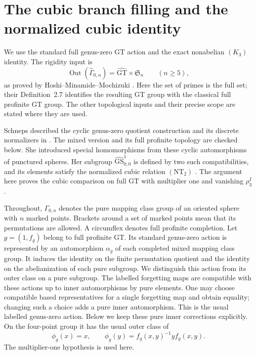 \section{The cubic branch filling and the normalized cubic identity}
\label{sec:normalized-cubic-identity}

We use the standard full genus-zero GT action and the exact
nonabelian $(K_3)$ identity. The rigidity input is
\begin{equation}\label{eq:cubic-normalizer-1}
\operatorname{Out}(\widehat\Gamma_{0,n})
 =\widehat{\mathrm{GT}}\times\mathfrak S_n\qquad(n\ge5),
\end{equation}
as proved by Hoshi--Minamide--Mochizuki
\cite[Definition~2.7 and Corollary~2.8(i), author pp.~31--32]{CubicHMM}.
Here the set of primes is the full set; their Definition~2.7
identifies the resulting GT group with the classical full
profinite GT group. The other topological inputs and their
precise scope are stated where they are used.

Schneps described the cyclic genus-zero quotient construction and its
discrete normalizers in \cite[Section~4.3,
Theorems~4.3.1--4.3.2, author pp.~54--58]{SchnepsSpecialLoci}.
The mixed version and its full profinite topology are checked below.
She introduced special homomorphisms from these cyclic automorphisms
of punctured spheres. Her subgroup $\widehat{\mathrm{GS}}^1_{0,0}$
is defined by two such compatibilities, and its elements satisfy
the normalized cubic relation $(\mathrm{NT}_2)$
\cite[Definition~1.2, p.~658; Theorems~3.1 and~3.4,
pp.~665 and~667]{Schneps2006Special}.
The argument here proves the cubic comparison on full GT with
multiplier one and vanishing $\rho_3^I$.


Throughout, $\Gamma_{0,n}$ denotes the pure mapping class
group of an oriented sphere with $n$ marked points. Brackets
around a set of marked points mean that its permutations are
allowed. A circumflex denotes full profinite completion.
Let $g=(1,f_g)$ belong to full profinite GT. Its standard genus-zero
action \cite[equation~(1.3), p.~657]{Schneps2006Special}
is represented by an automorphism $\alpha_g$
of each completed mixed mapping class group. It induces the
identity on the finite permutation quotient and the identity
on the abelianization of each pure subgroup. We distinguish
this action from its outer class on a pure subgroup.
The labelled forgetting maps are compatible with these actions
up to inner automorphisms by pure elements. One may choose
compatible based representatives for a single forgetting map
and obtain equality; changing such a choice adds a pure inner
automorphism. This is the usual labelled genus-zero action.
Below we keep these
pure inner corrections explicitly. On the four-point group it
has the usual outer class of
\begin{equation}\label{eq:cubic-normalizer-2}
\phi_g(x)=x,\qquad
 \phi_g(y)=f_g(x,y)^{-1}y f_g(x,y).
\end{equation}
The multiplier-one hypothesis is used here.

